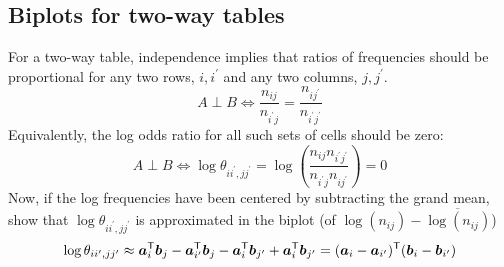 \subsection{Biplots for two-way tables}\label{sec:biplot2}
For a two-way table, independence
implies that ratios of frequencies should be proportional for any
two rows, $i, i^{\prime}$ and any two columns, $j, j^{\prime}$.
\begin{equation*}
A \perp B \iff \frac{n_{ij}}{n_{i^{\prime} j}} = \frac{n_{ij^{\prime}}}{n_{i^{\prime} j^{\prime}}}
\end{equation*}
Equivalently, the log odds ratio for all such sets of cells should
be zero:
\begin{equation*}
A \perp B \iff \log \theta_{i i^{\prime}, j j^{\prime}} = \log \left( \frac{n_{ij} n_{i^{\prime} j^{\prime}}} {n_{i^{\prime} j}  n_{ij^{\prime}}} \right) = 0
\end{equation*}
Now, if the log frequencies have been
centered by subtracting the grand mean,
\citet{Gabriel-etal:97} show that $\log \theta_{i i^{\prime}, j j^{\prime}}$
is approximated in the biplot (of $\log(n_{ij}) - \overline{ \log(n_{ij}) }$)
\begin{equation*}
\log \theta_{i i^{\prime}, j j^{\prime}} \approx
\bm{a}_i ^\mathsf{T} \bm{b}_j - \bm{a}_{i^{\prime}} ^\mathsf{T} \bm{b}_j -
\bm{a}_i ^\mathsf{T} \bm{b}_{j^{\prime}} + \bm{a}_i ^\mathsf{T} \bm{b}_{j^{\prime}}
= ( \bm{a}_i - \bm{a}_{i^{\prime}} )^\mathsf{T} ( \bm{b}_i - \bm{b}_{i^{\prime}} )
\end{equation*}

